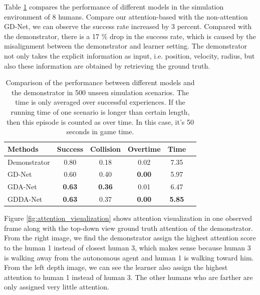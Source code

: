 \documentclass[10pt,twocolumn,letterpaper]{article}
\begin{document}
Table \ref{tb:simulation_results} compares the performance of different models in the simulation environment of 8 humans. Compare our attention-based with the non-attention GD-Net, we can observe the success rate increased by 3 percent. Compared with the demonstrator, there is a 17 \% drop in the success rate, which is caused by the misalignment between the demonstrator and learner setting. The demonstrator not only takes the explicit information as input, i.e. position, velocity, radius, but also these information are obtained by retrieving the ground truth. 

\begin{table} \label{tb:simulation_results}
\begin{center}
\begin{tabular}{|l|c|c|c|c|c|}
\hline
Methods & Success & Collision & Overtime & Time \\
\hline
Demonstrator    & 0.80 & 0.18 & 0.02 & 7.35  \\
\hline
GD-Net          & 0.60 & 0.40 & \textbf{0.00} & 5.97  \\
GDA-Net         & \textbf{0.63} & \textbf{0.36} & 0.01 & 6.47 \\
GDDA-Net        & \textbf{0.63} & 0.37 & \textbf{0.00} & \textbf{5.85} \\
\hline
\end{tabular}
\end{center}
\caption{Comparison of the performance between different models and the demonstrator in 500 unseen simulation scenarios. The time is only averaged over successful experiences. If the running time of one scenario is longer than certain length, then this episode is counted as over time. In this case, it's 50 seconds in game time.}
\end{table}

Figure \ref{fig:attention_visualization} shows attention visualization in one observed frame along with the top-down view ground truth attention of the demonstrator. From the right image, we find the demonstrator assign the highest attention score to the human 1 instead of closest human 3, which makes sense because human 3 is walking away from the autonomous agent and human 1 is walking toward him. From the left depth image, we can see the learner also assign the highest attention to human 1 instead of human 3. The other humans who are farther are only assigned very little attention.
\end{document}
